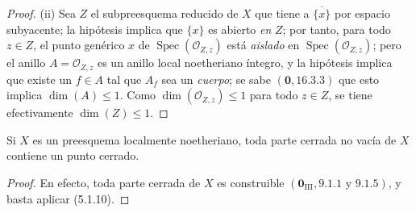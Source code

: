 \begin{proof}
\textup{(ii)} Sea $Z$ el subpreesquema reducido de $X$ que tiene a
$\overline{\{x\}}$ por espacio
subyacente; la hipótesis implica que $\{x\}$ es abierto \emph{en} $Z$;
por tanto, para todo $z\in Z$, el punto genérico $x$ de
$\operatorname{Spec}(\mathcal O_{Z,z})$ está \emph{aislado} en
$\operatorname{Spec}(\mathcal O_{Z,z})$; pero el anillo
$A=\mathcal O_{Z,z}$ es un anillo local noetheriano íntegro, y la hipótesis
implica que existe un $f\in A$ tal que $A_f$ sea un \emph{cuerpo}; se sabe
$(\mathbf{0},16.3.3)$ que esto implica $\dim(A)\leq1$. Como
$\dim(\mathcal O_{Z,z})\leq1$ para todo $z\in Z$, se tiene efectivamente
$\dim(Z)\leq1$.
\end{proof}

\begin{corollary}[5.1.11]
\label{IV.2.5.1.11-fr}
Si $X$ es un preesquema localmente noetheriano, toda parte cerrada no vacía de
$X$ contiene un punto cerrado.
\end{corollary}

\begin{proof}
En efecto, toda parte cerrada de $X$ es construible
$(\mathbf{0}_{\mathrm{III}},9.1.1\text{ y }9.1.5)$, y basta aplicar (5.1.10).
\end{proof}
